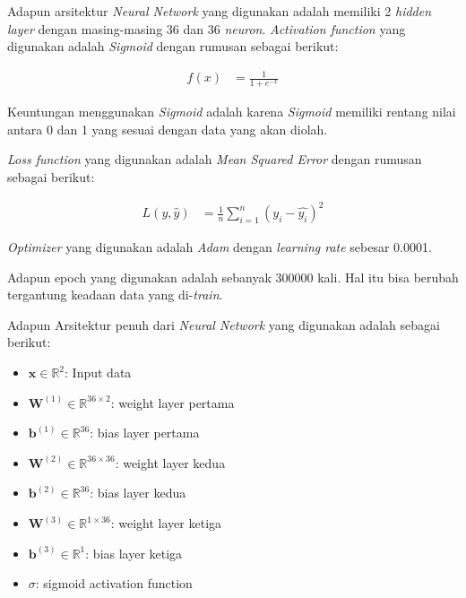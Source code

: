 Adapun arsitektur \textit{Neural Network} yang digunakan adalah memiliki 2 \textit{hidden layer} dengan masing-masing 36 dan 36 \textit{neuron}. \textit{Activation function} yang digunakan adalah \textit{Sigmoid} dengan rumusan sebagai berikut: 

\begin{equation}
  \begin{aligned}
    f(x) &= \frac{1}{1 + e^{-x}}
  \end{aligned}
\end{equation}

Keuntungan menggunakan \textit{Sigmoid} adalah karena \textit{Sigmoid} memiliki rentang nilai antara 0 dan 1 yang sesuai dengan data yang akan diolah. 

\textit{Loss function} yang digunakan adalah \textit{Mean Squared Error} dengan rumusan sebagai berikut: 

\begin{equation}
  \begin{aligned}
    L(y, \hat{y}) &= \frac{1}{n} \sum_{i=1}^{n} (y_i - \hat{y_i})^2
  \end{aligned}
\end{equation}

\textit{Optimizer} yang digunakan adalah \textit{Adam} dengan \textit{learning rate} sebesar 0.0001.

Adapun epoch yang digunakan adalah sebanyak 300000 kali. Hal itu bisa berubah tergantung keadaan data yang di-\textit{train}. 

Adapun Arsitektur penuh dari \textit{Neural Network} yang digunakan adalah sebagai berikut: 

\begin{itemize}
    \item \( \mathbf{x} \in \mathbb{R}^2 \): Input data
    \item \( \mathbf{W}^{(1)} \in \mathbb{R}^{36 \times 2} \): weight layer pertama
    \item \( \mathbf{b}^{(1)} \in \mathbb{R}^{36} \): bias layer pertama
    \item \( \mathbf{W}^{(2)} \in \mathbb{R}^{36 \times 36} \): weight layer kedua
    \item \( \mathbf{b}^{(2)} \in \mathbb{R}^{36} \): bias layer kedua
    \item \( \mathbf{W}^{(3)} \in \mathbb{R}^{1 \times 36} \): weight layer ketiga
    \item \( \mathbf{b}^{(3)} \in \mathbb{R}^{1} \): bias layer ketiga
    \item \( \sigma \): sigmoid activation function
\end{itemize}

